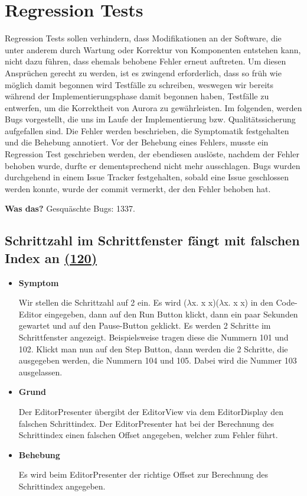 \documentclass[parskip=full,11pt,twoside]{scrartcl}
\newcommand{\issueref}[1]{
    \href{https://git.scc.kit.edu/ap/Aurora/issues/#1}{(#1)}
}
\newcommand{\regrtest}[5]{
    \subsection{#1 \issueref{#2}}
    \begin{itemize}
        \item \textbf{Symptom}
            #3
        \item \textbf{Grund}
            #4
        \item \textbf{Behebung}
            #5
    \end{itemize}
}
\begin{document}
\section{Regression Tests}
    Regression Tests sollen verhindern, dass Modifikationen an der Software, die unter anderem durch Wartung oder Korrektur von Komponenten entstehen kann, nicht dazu führen,
        dass ehemals behobene Fehler erneut auftreten.
    Um diesen Ansprüchen gerecht zu werden, ist es zwingend erforderlich, dass so früh wie möglich damit begonnen wird Testfälle zu schreiben,
        weswegen wir bereits während der Implementierungsphase damit begonnen haben, Testfälle zu entwerfen, um die Korrektheit von Aurora zu gewährleisten.
    Im folgenden, werden Bugs vorgestellt, die uns im Laufe der Implementierung bzw. Qualitätssicherung aufgefallen sind.
    Die Fehler werden beschrieben, die Symptomatik festgehalten und die Behebung annotiert.
    Vor der Behebung eines Fehlers, musste ein Regression Test geschrieben werden, der ebendiesen auslöste, nachdem der Fehler behoben wurde, durfte er dementsprechend nicht mehr ausschlagen.
    Bugs wurden durchgehend in einem Issue Tracker festgehalten, sobald eine Issue geschlossen werden konnte, wurde der commit vermerkt, der den Fehler behoben hat.
    
    \textbf{Was das?}
    Gesquäschte Bugs: 1337.

    \regrtest{Schrittzahl im Schrittfenster fängt mit falschen Index an}{120}{
        Wir stellen die Schrittzahl auf 2 ein.
        Es wird ($\lambda$x. x x)($\lambda$x. x x) in den Code-Editor eingegeben,
            dann auf den Run Button klickt, dann ein paar Sekunden gewartet und auf den Pause-Button geklickt.
        Es werden 2 Schritte im Schrittfenster angezeigt.
        Beispielsweise tragen diese die Nummern 101 und 102.
        Klickt man nun auf den Step Button, dann werden die 2 Schritte, die ausgegeben werden, die Nummern 104 und 105.
        Dabei wird die Nummer 103 ausgelassen.
    }{
        Der EditorPresenter übergibt der EditorView via dem EditorDisplay den falschen Schrittindex.
        Der EditorPresenter hat bei der Berechnung des Schrittindex einen falschen Offset angegeben, welcher zum Fehler führt.
    }{
        Es wird beim EditorPresenter der richtige Offset zur Berechnung des Schrittindex angegeben.
    }
\end{document}
